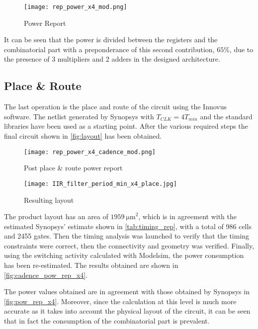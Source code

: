 \begin{figure}[htb!]
	\center
	\texttt{[image: rep\_power\_x4\_mod.png]}
	\caption{Power Report}
	\label{fig:pow_rep_x4}
\end{figure}

It can be seen that the power is divided between the registers and the combinatorial part with a preponderance of this second contribution, $65\%$, due to the presence of 3 multipliers and 2 adders in the designed architecture.

\subsection{Place \& Route}
The last operation is the place and route of the circuit using the Innovus software. The netlist generated by Synopsys with $T_{CLK} = 4 T_{min}$ and the standard libraries have been used as a starting point. After the various required steps the final circuit shown in \autoref{fig:layout} has been obtained.

\begin{figure}[htb]
	\center
	\texttt{[image: rep\_power\_x4\_cadence\_mod.png]}
	\caption{Post place \& route power report}
	\label{fig:cadence_pow_rep_x4}
\end{figure}

\begin{figure}[htb!]
	\center
	\texttt{[image: IIR\_filter\_period\_min\_x4\_place.jpg]}
	\caption{Resulting layout}
	\label{fig:layout}
\end{figure}

The product layout has an area of $\SI{1959}{\micro\meter}^2$, which is in agreement with the estimated Synopsys' estimate shown in \autoref{tab:timing_rep}, with a total of 986 cells and 2455 gates. Then the timing analysis was launched to verify that the timing constraints were correct, then the connectivity and geometry was verified. Finally, using the switching activity calculated with Modelsim, the power consumption has been re-estimated. The results obtained are shown in \autoref{fig:cadence_pow_rep_x4}.


The power values obtained are in agreement with those obtained by Synopsys in \autoref{fig:pow_rep_x4}. Moreover, since the calculation at this level is much more accurate as it takes into account the physical layout of the circuit, it can be seen that in fact the consumption of the combinatorial part is prevalent.
